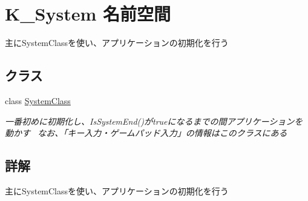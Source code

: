 \hypertarget{namespace_k___system}{}\section{K\+\_\+\+System 名前空間}
\label{namespace_k___system}


主に\+System\+Classを使い、アプリケーションの初期化を行う  


\subsection*{クラス}
\begin{DoxyCompactItemize}
\item 
class \mbox{\hyperlink{class_k___system_1_1_system_class}{System\+Class}}
\begin{DoxyCompactList}\small\item\em 一番初めに初期化し、\+Is\+System\+End()がtrueになるまでの間アプリケーションを動かす~\newline
なお、「キー入力・ゲームパッド入力」の情報はこのクラスにある \end{DoxyCompactList}\end{DoxyCompactItemize}


\subsection{詳解}
主に\+System\+Classを使い、アプリケーションの初期化を行う 